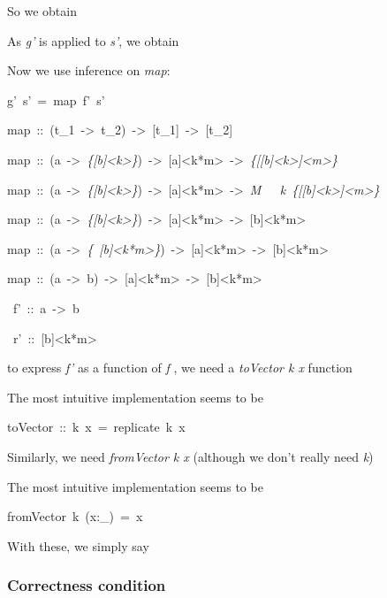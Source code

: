 \documentclass{article}
\newenvironment{lyxcode}
{\par\begin{list}{}{
\setlength{\rightmargin}{\leftmargin}
\setlength{\listparindent}{0pt}\raggedright
\setlength{\itemsep}{0pt}
\setlength{\parsep}{0pt}
\normalfont\ttfamily}\item[]}
{\end{list}}
\begin{document}
So we obtain
\begin{lyxcode}

\end{lyxcode}
As \emph{g'} is applied to \emph{s'}, we obtain 
\begin{lyxcode}

\end{lyxcode}
Now we use inference on \emph{map}:
\begin{lyxcode}
g'~s'~=~map~f'~s'

map~::~(t\_1~->~t\_2)~->~{[}t\_1{]}~->~{[}t\_2{]}

map~::~(a~->~\emph{\{{[}b{]}<k>\}})~->~{[}a{]}<k{*}m>~->~\emph{\{{[}{[}b{]}<k>{]}<m>\}}

map~::~(a~->~\emph{\{{[}b{]}<k>\}})~->~{[}a{]}<k{*}m>~->~\emph{M~}~\emph{~k~\{{[}{[}b{]}<k>{]}<m>\}}

map~::~(a~->~\emph{\{{[}b{]}<k>\}})~->~{[}a{]}<k{*}m>~->~{[}b{]}<k{*}m>

map~::~(a~->~\emph{\{}~\emph{{[}b{]}<k{*}m>\}})~->~{[}a{]}<k{*}m>~->~{[}b{]}<k{*}m>

map~::~(a~->~b)~->~{[}a{]}<k{*}m>~->~{[}b{]}<k{*}m>

~f'~::~a~->~b

~r'~::~{[}b{]}<k{*}m>
\end{lyxcode}
to express \emph{f'} as a function of \emph{f} , we need a \emph{toVector
k x} function
\begin{lyxcode}

\end{lyxcode}
The most intuitive implementation seems to be
\begin{lyxcode}
toVector~::~k~x~=~replicate~k~x
\end{lyxcode}
Similarly, we need \emph{fromVector k x} (although we don't really
need \emph{k})
\begin{lyxcode}

\end{lyxcode}
The most intuitive implementation seems to be
\begin{lyxcode}
fromVector~k~(x:\_)~=~x
\end{lyxcode}
With these, we simply say
\begin{lyxcode}

\end{lyxcode}

\subsubsection{Correctness condition}
\end{document}
